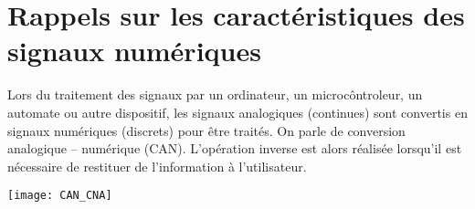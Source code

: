 \def\xxactivite{Cours}
\def\xxauteur{\textsl{Xavier Pessoles}}

\fichefalse \proftrue \tdfalse \courstrue

\def\xxnumchapitre{Chapitre 2 \vspace{.2cm}}
\def\xxchapitre{\hspace{.12cm} Correction numérique des systèmes asservis}

\def\xxcompetences{%
\textsl{%
\textbf{Savoirs et compétences :}\\
\begin{itemize}[label=\ding{112},font=\color{ocre}] 
\item B2-09 : Modéliser un correcteur numérique :
\begin{itemize}
\item caractérisation des signaux à temps discret (échantillonnage et quantification);
\item modélisation par équations aux différences (équations de récurrence) d'un correcteur numérique (proportionnel, proportionnel intégral et à avance de phase).
\end{itemize}
\end{itemize}
}}


\def\xxfigures{
}%




\setlength{\columnseprule}{.1pt}

\vspace{2cm}
\pagestyle{fancy}
\thispagestyle{plain}


\section{Rappels sur les caractéristiques des signaux numériques}
Lors du traitement des signaux par un ordinateur, un microcôntroleur, un automate ou autre dispositif, les signaux analogiques (continues) sont convertis en signaux numériques (discrets) pour être traités. On parle de conversion analogique -- numérique (CAN). 
L'opération inverse est alors réalisée lorsqu'il est nécessaire de restituer de l'information à l'utilisateur.
\begin{center}
\texttt{[image: CAN\_CNA]}
\end{center}

